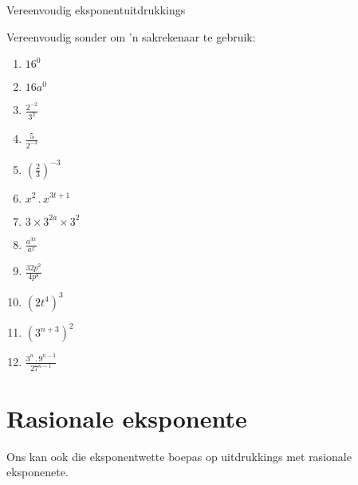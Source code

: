 \begin{exercises}{Vereenvoudig eksponentuitdrukkings}
{
Vereenvoudig sonder om ’n sakrekenaar te gebruik:
\begin{multicols}{2}
\begin{enumerate}[noitemsep, label=\textbf{\arabic*}., itemsep=5pt]
 \item $16^0$
 \item $16a^0$
 \item $\frac{2^{-2}}{3^2}$
 \item $ \frac{5}{2^{-3}}$
 \item $ \left(\frac{2}{3}\right)^{-3} $
 \item $ x^2 \,.\, x^{3t+1} $
 \item $ 3 \times 3^{2a} \times 3^2$
 \item $ \frac{a^{3x}}{a^x} $
 \item $ \frac{32p^2}{4p^8}$
 \item $ (2t^4)^3$
 \item $ (3^{n+3})^2$
 \item $ \frac{3^n \,.\, 9^{n-3}}{27^{n-1}}$
\end{enumerate}
\end{multicols}

 

}
\end{exercises}




\section{Rasionale eksponente}

Ons kan ook die eksponentwette boepas op uitdrukkings met rasionale eksponenete.


